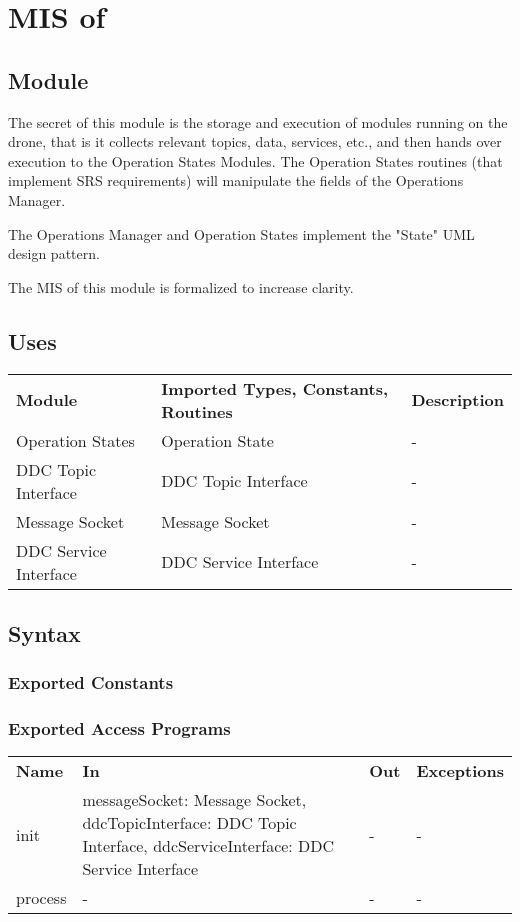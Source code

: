 \documentclass[12pt, titlepage]{article}
\begin{document}
\section{MIS of } \label{MIS_OPERATION_MANAGER} 
\subsection{Module}
The secret of this module is the storage and execution of  modules running on the drone, that is it collects relevant topics, data, services, etc., and then hands over execution to the Operation States Modules. The Operation States routines (that implement SRS requirements) will manipulate the fields of the Operations Manager. 

The Operations Manager and Operation States implement the "State" UML design pattern.

The MIS of this module is formalized to increase clarity.
\subsection{Uses}
\begin{center}
\begin{tabular}{p{2 cm} p{5cm} p{6.5cm} } 
\hline
\textbf{Module} & \textbf{Imported Types, Constants, Routines} & \textbf{Description} \\
Operation States & Operation State & - \\
DDC Topic Interface & DDC Topic Interface & - \\
Message Socket & Message Socket & - \\
DDC Service Interface & DDC Service Interface & - \\
\hline
\hline

\end{tabular}
\end{center}
\subsection{Syntax}
\subsubsection{Exported Constants}
\subsubsection{Exported Access Programs}
\begin{center}
\begin{tabular}{p{3.5cm} p{2.5cm} p{2.5cm} p{5cm}}
\hline
\textbf{Name} & \textbf{In} & \textbf{Out} & \textbf{Exceptions} \\
init & messageSocket: Message Socket, ddcTopicInterface: DDC Topic Interface, ddcServiceInterface: DDC Service Interface & - & - \\
process & - & - & - \\
\hline
\hline
\end{tabular}
\end{center}
\end{document}
